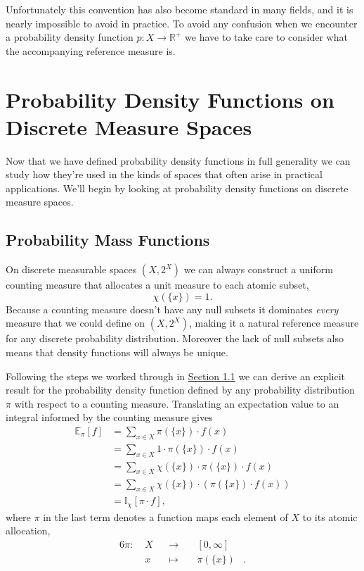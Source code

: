 \documentclass[
  letterpaper,
  DIV=11,
  numbers=noendperiod]{scrartcl}
\begin{document}
Unfortunately this convention has also become standard in many fields,
and it is nearly impossible to avoid in practice. To avoid any confusion
when we encounter a probability density function
\(p : X \rightarrow \mathbb{R}^{+}\) we have to take care to consider
what the accompanying reference measure is.

\hypertarget{probability-density-functions-on-discrete-measure-spaces}{%
\section{Probability Density Functions on Discrete Measure
Spaces}\label{probability-density-functions-on-discrete-measure-spaces}}

Now that we have defined probability density functions in full
generality we can study how they're used in the kinds of spaces that
often arise in practical applications. We'll begin by looking at
probability density functions on discrete measure spaces.

\hypertarget{probability-mass-functions}{%
\subsection{Probability Mass
Functions}\label{probability-mass-functions}}

On discrete measurable spaces \((X, 2^{X})\) we can always construct a
uniform counting measure that allocates a unit measure to each atomic
subset, \[
\chi( \{ x \} ) = 1.
\] Because a counting measure doesn't have any null subsets it dominates
\emph{every} measure that we could define on \((X, 2^{X})\), making it a
natural reference measure for any discrete probability distribution.
Moreover the lack of null subsets also means that density functions will
always be unique.

Following the steps we worked through in
\href{@sec:finite_densities}{Section 1.1} we can derive an explicit
result for the probability density function defined by any probability
distribution \(\pi\) with respect to a counting measure. Translating an
expectation value to an integral informed by the counting measure gives
\begin{align*}
\mathbb{E}_{\pi}[f]
&=
\sum_{x \in X}
\pi( \{ x \} ) \cdot f(x)
\\
&=
\sum_{x \in X}
1 \cdot \pi( \{ x \} ) \cdot f(x)
\\
&=
\sum_{x \in X}
\chi( \{ x \} ) \cdot \pi( \{ x \} ) \cdot f(x)
\\
&=
\sum_{x \in X}
\chi( \{ x \} ) \cdot \left( \pi( \{ x \} ) \cdot f(x) \right)
\\
&=
\mathbb{I}_{\chi} [ \pi \cdot f ],
\end{align*} where \(\pi\) in the last term denotes a function maps each
element of \(X\) to its atomic allocation, \begin{alignat*}{6}
\pi :\; & X & &\rightarrow& \; & [0, \infty] &
\\
& x & &\mapsto& & \pi( \{ x \} ) &.
\end{alignat*}
\end{document}
